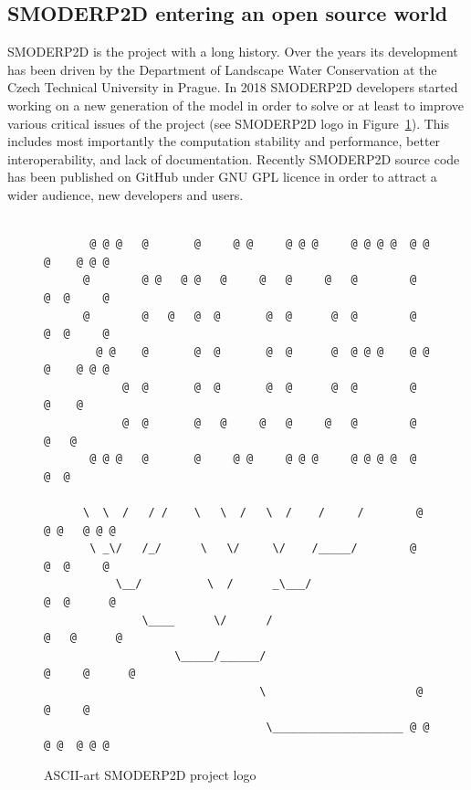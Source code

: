 \subsection{SMODERP2D entering an open source world}\label{ref:open_source_providers}

SMODERP2D is the project with a long history. Over the years its
development has been driven by the Department of Landscape Water
Conservation at the Czech Technical University in Prague. In 2018
SMODERP2D developers started working on a new generation of the model
in order to solve or at least to improve various critical issues of
the project (see SMODERP2D logo in Figure~\ref{fig:smoderp2d_logo}). 
This includes most importantly the computation stability
and performance, better interoperability, and lack of
documentation. Recently SMODERP2D source code has been published on
GitHub \cite{smoderp2d-github-2019} under GNU GPL licence in order to
attract a wider audience, new developers and users.

\begin{figure}[ht!]
  {\tiny
\begin{verbatim}

       @ @ @   @       @     @ @     @ @ @     @ @ @ @  @ @ @    @ @ @
      @        @ @   @ @   @     @   @     @   @        @     @  @     @
      @        @   @   @  @       @  @      @  @        @     @  @     @
        @ @    @       @  @       @  @      @  @ @ @    @ @ @    @ @ @
            @  @       @  @       @  @      @  @        @   @    @
            @  @       @   @     @   @     @   @        @    @   @
       @ @ @   @       @     @ @     @ @ @     @ @ @ @  @     @  @

      \  \  /   / /    \   \  /   \  /    /     /        @ @ @   @ @ @
       \ _\/   /_/      \   \/     \/    /_____/        @     @  @     @
           \__/          \  /      _\___/                     @  @      @
               \____      \/      /                          @   @      @
                    \_____/______/                         @     @      @
                                 \                       @       @     @
                                  \____________________ @ @ @ @  @ @ @
\end{verbatim}
}
\caption{ASCII-art SMODERP2D project logo}
\label{fig:smoderp2d_logo}
\end{figure}

